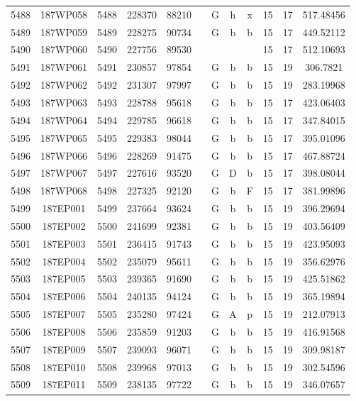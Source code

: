 \begin{tabular}{|*{12}{c|}}
5488 & 187WP058 & 5488 & 228370 & 88210 &  & G & h & x & 15 & 17 & 517.48456 \\ 
5489 & 187WP059 & 5489 & 228275 & 90734 &  & G & b & b & 15 & 17 & 449.52112 \\ 
5490 & 187WP060 & 5490 & 227756 & 89530 &  &  &  &  & 15 & 17 & 512.10693 \\ 
5491 & 187WP061 & 5491 & 230857 & 97854 &  & G & b & b & 15 & 19 & 306.7821 \\ 
5492 & 187WP062 & 5492 & 231307 & 97997 &  & G & b & b & 15 & 19 & 283.19968 \\ 
5493 & 187WP063 & 5493 & 228788 & 95618 &  & G & b & b & 15 & 17 & 423.06403 \\ 
5494 & 187WP064 & 5494 & 229785 & 96618 &  & G & b & b & 15 & 17 & 347.84015 \\ 
5495 & 187WP065 & 5495 & 229383 & 98044 &  & G & b & b & 15 & 17 & 395.01096 \\ 
5496 & 187WP066 & 5496 & 228269 & 91475 &  & G & b & b & 15 & 17 & 467.88724 \\ 
5497 & 187WP067 & 5497 & 227616 & 93520 &  & G & D & b & 15 & 17 & 398.08044 \\ 
5498 & 187WP068 & 5498 & 227325 & 92120 &  & G & b & F & 15 & 17 & 381.99896 \\ 
5499 & 187EP001 & 5499 & 237664 & 93624 &  & G & b & b & 15 & 19 & 396.29694 \\ 
5500 & 187EP002 & 5500 & 241699 & 92381 &  & G & b & b & 15 & 19 & 403.56409 \\ 
5501 & 187EP003 & 5501 & 236415 & 91743 &  & G & b & b & 15 & 19 & 423.95093 \\ 
5502 & 187EP004 & 5502 & 235079 & 95611 &  & G & b & b & 15 & 19 & 356.62976 \\ 
5503 & 187EP005 & 5503 & 239365 & 91690 &  & G & b & b & 15 & 19 & 425.51862 \\ 
5504 & 187EP006 & 5504 & 240135 & 94124 &  & G & b & b & 15 & 19 & 365.19894 \\ 
5505 & 187EP007 & 5505 & 235280 & 97424 &  & G & A & p & 15 & 19 & 212.07913 \\ 
5506 & 187EP008 & 5506 & 235859 & 91203 &  & G & b & b & 15 & 19 & 416.91568 \\ 
5507 & 187EP009 & 5507 & 239093 & 96071 &  & G & b & b & 15 & 19 & 309.98187 \\ 
5508 & 187EP010 & 5508 & 239968 & 97013 &  & G & b & b & 15 & 19 & 302.54596 \\ 
5509 & 187EP011 & 5509 & 238135 & 97722 &  & G & b & b & 15 & 19 & 346.07657 \\ 

\end{tabular}
